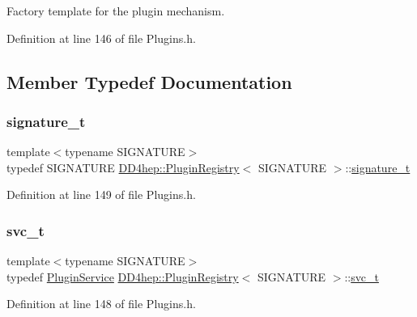 Factory template for the plugin mechanism. 

Definition at line 146 of file Plugins.\+h.



\subsection{Member Typedef Documentation}
\hypertarget{class_d_d4hep_1_1_plugin_registry_a7027450dd9c05ba16111485082222ade}{}\label{class_d_d4hep_1_1_plugin_registry_a7027450dd9c05ba16111485082222ade} 
\subsubsection{\texorpdfstring{signature\+\_\+t}{signature\_t}}
{\footnotesize\ttfamily template$<$typename S\+I\+G\+N\+A\+T\+U\+RE$>$ \\
typedef S\+I\+G\+N\+A\+T\+U\+RE \hyperlink{class_d_d4hep_1_1_plugin_registry}{D\+D4hep\+::\+Plugin\+Registry}$<$ S\+I\+G\+N\+A\+T\+U\+RE $>$\+::\hyperlink{class_d_d4hep_1_1_plugin_registry_a7027450dd9c05ba16111485082222ade}{signature\+\_\+t}}



Definition at line 149 of file Plugins.\+h.

\hypertarget{class_d_d4hep_1_1_plugin_registry_a4a7136b1696a7da6212af835482dece9}{}\label{class_d_d4hep_1_1_plugin_registry_a4a7136b1696a7da6212af835482dece9} 
\subsubsection{\texorpdfstring{svc\+\_\+t}{svc\_t}}
{\footnotesize\ttfamily template$<$typename S\+I\+G\+N\+A\+T\+U\+RE$>$ \\
typedef \hyperlink{class_d_d4hep_1_1_plugin_service}{Plugin\+Service} \hyperlink{class_d_d4hep_1_1_plugin_registry}{D\+D4hep\+::\+Plugin\+Registry}$<$ S\+I\+G\+N\+A\+T\+U\+RE $>$\+::\hyperlink{class_d_d4hep_1_1_plugin_registry_a4a7136b1696a7da6212af835482dece9}{svc\+\_\+t}}



Definition at line 148 of file Plugins.\+h.



